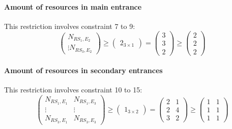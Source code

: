 \paragraph{Amount of resources in main entrance}
This restriction involves constraint 7 to 9:
\begin{equation}
    \begin{pmatrix}
            N_{RS_1,E_2}\\
            \vdots
            N_{RS_3,E_2}
    \end{pmatrix}
    \geq
    \begin{pmatrix}
            2_{3 \times 1}
    \end{pmatrix}
    =
    \begin{pmatrix}
            3\\
            3\\
            2
    \end{pmatrix}
    \geq
    \begin{pmatrix}
            2\\
            2\\
            2
    \end{pmatrix}
\end{equation}

\paragraph{Amount of resources in secondary entrances}
This restriction involves constraint 10 to 15:
\begin{equation}
    \begin{pmatrix}
            N_{RS_1,E_1} & N_{RS_1,E_3}\\
            \vdots & \vdots\\
            N_{RS_3,E_1} & N_{RS_3,E_3}
    \end{pmatrix}
    \geq
    \begin{pmatrix}
            1_{3 \times 2}
    \end{pmatrix}
    =
    \begin{pmatrix}
            2 & 1\\
            2 & 4\\
            3 & 2
    \end{pmatrix}
    \geq
    \begin{pmatrix}
            1 & 1\\
            1 & 1\\
            1 & 1
    \end{pmatrix}
\end{equation}

